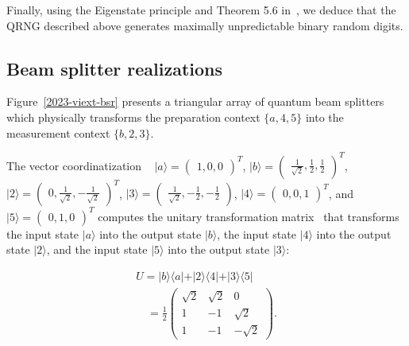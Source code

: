 \documentclass[%
 reprint,
 superscriptaddress,
 showpacs,
 showkeys,
 nofootinbib,
  amsmath,amssymb,
 pra,
  longbibliography,
  floatfix,
 ]{revtex4-2}
\theoremstyle{definition}
\begin{document}
Finally, using the Eigenstate principle
and Theorem 5.6 in~\cite{RSPA23}, we deduce that the QRNG described above generates maximally unpredictable binary random digits.
\subsection{Beam splitter realizations}

Figure~\ref{2023-viext-bsr} presents a triangular array of quantum  beam splitters
 which physically transforms the preparation context  $\{a,4,5\}$
into the measurement context $\{b,2,3\}$.

The vector coordinatization ~\cite[Table~I]{2018-minimalYIYS}
$\vert a \rangle = \begin{pmatrix} 1, 0, 0\end{pmatrix}^T$,
$\vert b \rangle = \begin{pmatrix} \frac1{\sqrt{2}}, \frac12, \frac12 \end{pmatrix}^T$,
$\vert 2 \rangle = \begin{pmatrix} 0, \frac1{\sqrt{2}}, -\frac1{\sqrt{2}} \end{pmatrix}^T$,
$\vert 3 \rangle = \begin{pmatrix} \frac1{\sqrt{2}}, -\frac12, -\frac12 \end{pmatrix}$,
$\vert 4 \rangle = \begin{pmatrix} 0, 0, 1\end{pmatrix}^T$, and
$\vert 5 \rangle = \begin{pmatrix} 0, 1, 0\end{pmatrix}^T$
computes the unitary transformation matrix~\cite{Schwinger.60,Joglekar-I}
that transforms the input state $\vert a\rangle$ into the output state $\vert b\rangle$,
 the input state $\vert 4\rangle$ into the output state $\vert 2\rangle$,
and  the input state $\vert 5\rangle$ into the output state $\vert 3\rangle$:

\begin{equation}
\begin{split}
U =
\vert b \rangle \langle a \vert
+
\vert 2 \rangle \langle 4 \vert
+
\vert 3 \rangle \langle 5 \vert  \\
\quad =  \frac12
\begin{pmatrix}
\sqrt{2} &  \sqrt{2}& 0\\
1& -1&  \sqrt{2} \\
1& -1& - \sqrt{2}
\end{pmatrix}
.
\end{split}
\label{2023-viext-uo}
\end{equation}
\end{document}
